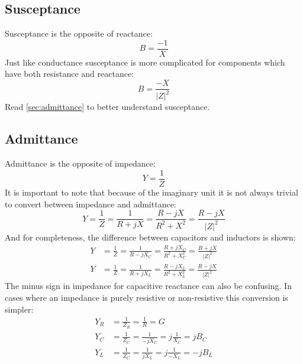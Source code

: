 \subsection{Susceptance}\label{sec:susceptance}
Susceptance is the opposite of reactance:
\begin{equation}
    B = \frac{-1}{X}
\end{equation}
Just like conductance susceptance is more complicated for components which 
have both resistance and reactance:
\begin{equation}
    B = \frac{-X}{|Z|^2}
\end{equation}
Read \vref{sec:admittance} to better understand susceptance.
\subsection{Admittance}\label{sec:admittance}
Admittance is the opposite of impedance:
\begin{equation}
    Y = \frac{1}{Z}
\end{equation}
It is important to note that because of the imaginary unit it is not always 
trivial to convert between impedance and admittance:
\begin{equation}
    Y = \frac{1}{Z} = \frac{1}{R + jX} = 
    \frac{R-jX}{R^2+X^2} = \frac{R-jX}{|Z|^2}
\end{equation}
And for completeness, the difference between capacitors and inductors is shown:
\begin{align*}
    Y &= \frac{1}{Z} = \frac{1}{R - jX_C} = 
    \frac{R+jX_C}{R^2+X_C^2} = \frac{R+jX}{|Z|^2}\\
    Y &= \frac{1}{Z} = \frac{1}{R + jX_L} = 
    \frac{R-jX_L}{R^2+X_L^2} = \frac{R-jX}{|Z|^2}
\end{align*}
The minus sign in impedance for capacitive reactance can also be confusing.
In cases where an impedance is purely resistive or non-resistive this 
conversion is simpler:
\begin{align*}
    Y_R &= \frac{1}{Z_R} = \frac{1}{R} = G\\
    Y_C &= \frac{1}{Z_C} = \frac{1}{-jX_C} = j\frac{1}{X_C} = jB_C\\
    Y_L &= \frac{1}{Z_C} = \frac{1}{jX_L} = j\frac{1}{-X_L} = -jB_L\\
\end{align*}
